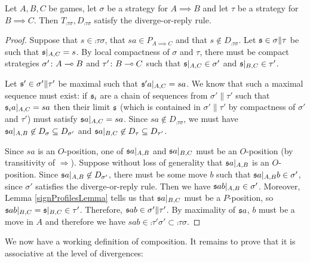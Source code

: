 \documentclass{entcs} \usepackage{prentcsmacro}
\newcommand{\0}{{\mathtt{0}}}
\begin{document}
\begin{proposition}
  Let $A,B,C$ be games, let $\sigma$ be a strategy for $A\implies B$ and let $\tau$ be a strategy for $B\implies C$.  Then $T_{\comp\tau\sigma}, D_{\comp\tau\sigma}$ satisfy the diverge-or-reply rule.

\end{proposition}
  \begin{proof}
    Suppose that $s\in\comp\tau\sigma$, that $sa\in P_{A\implies C}$ and that $s\not\in D_{\comp\tau\sigma}$.  Let $\mathfrak s\in\sigma\|\tau$ be such that $\mathfrak s\vert_{A,C}=s$.  By local compactness of $\sigma$ and $\tau$, there must be compact strategies $\sigma'\colon A\multimap B$ and $\tau'\colon B\multimap C$ such that $\mathfrak s\vert_{A,C}\in\sigma'$ and $\mathfrak s\vert_{B,C}\in\tau'$.  
    
    Let $\mathfrak s'\in\sigma'\|\tau'$ be maximal such that $\mathfrak s'a\vert_{A,C}=sa$.  We know that such a maximal sequence must exist: if $\mathfrak s_i$ are a chain of sequences from $\sigma'\|\tau'$ such that $\mathfrak s_ia\vert_{A,C}=sa$ then their limit $\mathfrak s$ (which is contained in $\sigma'\|\tau'$ by compactness of $\sigma'$ and $\tau'$) must satisfy $\mathfrak s a\vert_{A,C}=s a$.  Since $sa\not\in D_{\comp\tau\sigma}$, we must have $\mathfrak s a\vert_{A,B}\not\in D_\sigma\subseteq D_{\sigma'}$ and $\mathfrak s a\vert_{B,C}\not\in D_\tau\subseteq D_{\tau'}$.  
    
    Since $sa$ is an $O$-position, one of $\mathfrak s a\vert_{A,B}$ and $\mathfrak s a\vert_{B,C}$ must be an $O$-position (by transitivity of $\Rightarrow$).  Suppose without loss of generality that $\mathfrak s a\vert_{A,B}$ is an $O$-position.  Since $\mathfrak s a\vert_{A,B}\not\in D_{\sigma'}$, there must be some move $b$ such that $\mathfrak s a\vert_{A,B}b\in\sigma'$, since $\sigma'$ satisfies the diverge-or-reply rule.  Then we have $\mathfrak s ab\vert_{A,B}\in\sigma'$.  Moreover, Lemma \ref{signProfilesLemma} tells us that $\mathfrak s a\vert_{B,C}$ must be a $P$-position, so $\mathfrak s ab\vert_{B,C}=\mathfrak s\vert_{B,C}\in\tau'$.  Therefore, $\mathfrak s ab\in\sigma'\|\tau'$.  By maximality of $\mathfrak s a$, $b$ must be a move in $A$ and therefore we have $sab\in\comp{\tau'}{\sigma'}\subset\comp\tau\sigma$.
  \end{proof}

We now have a working definition of composition.  It remains to prove that it is associative at the level of divergences:
\end{document}

